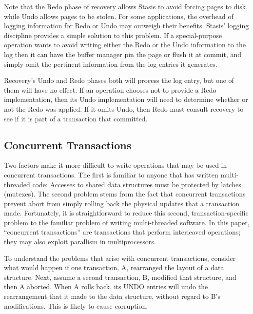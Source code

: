 \documentclass[letterpaper,twocolumn,10pt]{article}
\newcommand{\yad}{Stasis\xspace}
\newcommand{\yads}{Stasis'\xspace}
\begin{document}
Note that the Redo phase of recovery allows \yad to avoid forcing
pages to disk, while Undo allows pages to be stolen.  For some
applications, the overhead of logging information for Redo or Undo may
outweigh their benefits.  \yads logging discipline provides a simple
solution to this problem.  If a special-purpose operation wants to
avoid writing either the Redo or the Undo information to the log then
it can have the buffer manager pin the page or flush it at commit, and
simply omit the pertinent information from the log entries it
generates.

Recovery's Undo and Redo phases both will process the log entry, but
one of them will have no effect.  If an operation chooses not to
provide a Redo implementation, then its Undo implementation will need
to determine whether or not the Redo was applied.  If it omits Undo,
then Redo must consult recovery to see if it is part of a transaction that
committed.

\subsection{Concurrent Transactions}

Two factors make it more difficult to write operations that may be
used in concurrent transactions.  The first is familiar to anyone that
has written multi-threaded code: Accesses to shared data structures
must be protected by latches (mutexes).  The second problem stems from
the fact that concurrent transactions prevent abort from simply
rolling back the physical updates that a transaction made.
Fortunately, it is straightforward to reduce this second,
transaction-specific problem to the familiar problem of writing
multi-threaded software.  In this paper, ``concurrent
transactions'' are transactions that perform interleaved operations; they may also exploit parallism in multiprocessors.


To understand the problems that arise with concurrent transactions,
consider what would happen if one transaction, A, rearranged the
layout of a data structure.  Next, assume a second transaction, B,
modified that structure, and then A aborted.  When A rolls back, its
UNDO entries will undo the rearrangement that it made to the data
structure, without regard to B's modifications.  This is likely to
cause corruption.
\end{document}
